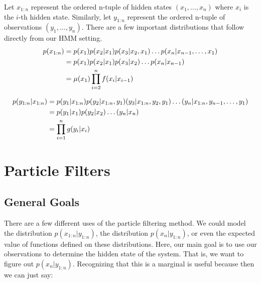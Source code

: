 \documentclass{article}
\begin{document}
Let $x_{1:n}$ represent the ordered n-tuple of hidden states $(x_1,\dots,x_n)$ where $x_i$ is the $i$-th hidden state. Similarly, let $y_{1:n}$ represent the ordered n-tuple of observations $(y_1,\dots,y_n)$. There are a few important distributions that follow directly from our HMM setting.
\begin{equation} \label{p(x_{1:n})}
\begin{split}
p(x_{1:n})
&= p(x_1)p(x_2|x_1)p(x_3|x_2,x_1)\dots p(x_n|x_{n-1},\dots,x_1)\\
&= p(x_1)p(x_2|x_1)p(x_3|x_2)\dots p(x_n|x_{n-1})\\
&=\mu(x_1)\prod_{i=2}^{n} f(x_i|x_{i-1})\\
\end{split}
\end{equation}

\begin{equation} \label{p(y_{1:n}|x_{1:n})}
\begin{split}
p(y_{1:n}|x_{1:n})
&= p(y_1|x_{1:n})p(y_2|x_{1:n},y_1)(y_3|x_{1:n},y_2,y_1)\dots (y_n|x_{1:n},y_{n-1},\dots,y_1)\\
&= p(y_1|x_1)p(y_2|x_2)\dots (y_n|x_n)\\
&= \prod_{i=1}^{n} g(y_i|x_i)\\
\end{split}
\end{equation}


\section{Particle Filters}
\subsection{General Goals}
There are a few different uses of the particle filtering method. We could model the distribution $p(x_{1:n}|y_{1:n})$, the distribution $p(x_n|y_{1:n})$, or even the expected value of functions defined on these distributions. Here, our main goal is to use our observations to determine the hidden state of the system. That is, we want to figure out $p(x_{n}|y_{1:n})$. Recognizing that this is a marginal is useful because then we can just say:
\end{document}
